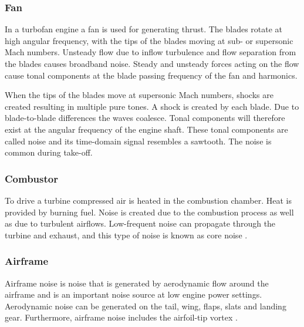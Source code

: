 \subsubsection{Fan}
In a turbofan engine a fan is used for generating thrust. The blades rotate at
high angular frequency, with the tips of the blades moving at sub- or supersonic
Mach numbers. Unsteady flow due to inflow turbulence and flow separation from
the blades causes broadband noise. Steady and unsteady forces acting on the flow
cause tonal components at the blade passing frequency of the fan and harmonics.

When the tips of the blades move at supersonic Mach numbers, shocks are created
resulting in multiple pure tones. A shock is created by each blade. Due to
blade-to-blade differences the waves coalesce. Tonal components will therefore
exist at the angular frequency of the engine shaft. These tonal components are
called  noise and its time-domain signal resembles a sawtooth.
The  noise is common during take-off.


\subsubsection{Combustor}
To drive a turbine compressed air is heated in the combustion chamber. Heat is
provided by burning fuel. Noise is created due to the combustion process as well
as due to turbulent airflows. Low-frequent noise can propagate through the
turbine and exhaust, and this type of noise is known as core noise \cite{Zaporozhets2011}.


\subsubsection{Airframe}
Airframe noise is noise that is generated by aerodynamic flow around the
airframe and is an important noise source at low engine power settings.
Aerodynamic noise can be generated on the tail, wing, flaps, slats and landing gear.
Furthermore, airframe noise includes the airfoil-tip vortex \cite{Zaporozhets2011}.


